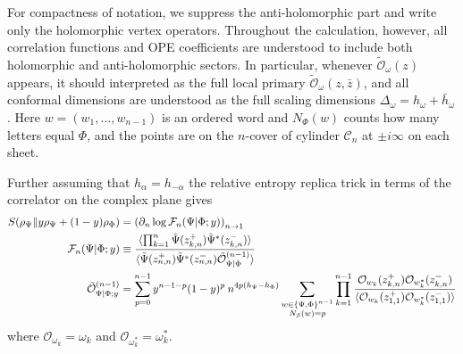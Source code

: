 \documentclass[11pt]{article}
\newcommand{\mO}{\mathcal{O}}
\newcommand{\nn}{\nonumber}
\newcommand{\lb}{\left(}
\newcommand{\rb}{\right)}
\begin{document}
  For compactness of notation, we suppress the anti-holomorphic part and write only the holomorphic vertex operators. Throughout the calculation, however, all correlation functions and OPE coefficients are understood to include both holomorphic and anti-holomorphic sectors. In particular, whenever 
  $\tilde{\mO}_\omega(z)$ appears, it should interpreted as the full local primary 
  $\tilde{\mO}_\omega(z,\bar z)$, and all conformal dimensions are understood as the full scaling dimensions $\Delta_\omega = h_\omega + \bar h_\omega$.
  Here $w=(w_{1},\dots,w_{n-1})$ is an ordered word and $N_{\Phi}(w)$ counts how
  many letters equal $\Phi$, and the points are on the $n$-cover of cylinder
  $\mathcal{C}_{n}$ at $\pm i\infty$ on each sheet.

 


  Further assuming that $h_{\alpha}=h_{-\alpha}$ the relative entropy replica
  trick in terms of the correlator on the complex plane gives
\begin{align}\label{CorrFn_mixed}
    S(\rho_\Psi\|y\rho_\Psi+(1-y)\rho_\Phi)&=\lb \partial_n\log\mathcal{F}_n(\Psi|\Phi;y)\rb_{n\to 1}\nn\\
    \mathcal{F}_n(\Psi|\Phi;y)&\equiv 
    \frac{\braket{\prod_{k=1}^{n} \tilde\Psi(z^+_{k,n})\tilde\Psi^*(z^-_{k,n})}}{\braket{\tilde\Psi(z^+_{n,n})\tilde\Psi^*(z^-_{n,n})\tilde{\mO}^{(n-1)}_{\Psi|\Phi}}}\nn\\
    \tilde{\mO}_{\Psi|\Phi;y}^{(n-1)}&=\sum_{p=0}^{n-1}y^{n-1-p}(1-y)^p\: n^{4p(h_\Psi-h_\Phi)}
    \sum_{\substack{w\in\{\Psi,\Phi\}^{n-1}\\ N_\beta(w)=p}} \prod_{k=1}^{n-1}\frac{\mO_{w_k}(z_{k,n}^{+})\mO_{w_k^*}(z_{k,n}^{-})}{\braket{\mO_{w_k}(z^+_{1,1})\mO_{w_k^*}(z^-_{1,1})}}\nn\\
  \end{align}
where $\mO_{\omega_k} = \omega_k$ and $\mO_{\omega_k^*} = \omega_k^*$.
\end{document}
